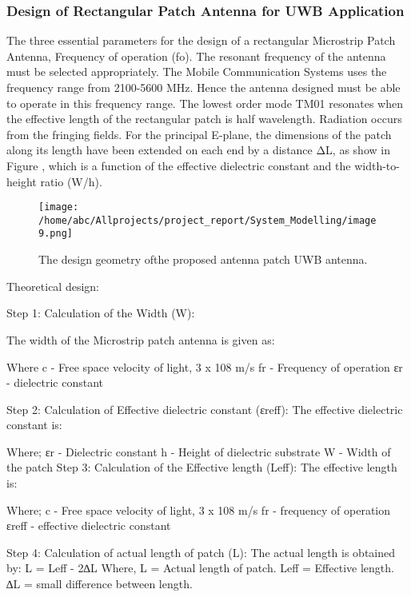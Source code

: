 \documentclass[12pt]{article}
\begin{document}
       \subsubsection{ Design of  Rectangular Patch Antenna for UWB Application}
        \justify
         The three essential parameters for the design of a rectangular Microstrip Patch Antenna, Frequency of operation (fo). The resonant frequency of the antenna must be selected appropriately. The Mobile Communication Systems uses the frequency range from 2100-5600 MHz. Hence the antenna designed must be able to operate in this frequency range. The lowest order mode TM01 resonates when the effective length of the rectangular patch is half wavelength. Radiation occurs from the fringing fields. For the principal E-plane, the dimensions of the patch along its length have been extended on each end by a distance ΔL, as show in Figure , which is a function of the effective dielectric constant and the width-to-height ratio (W/h).
          \begin{figure}
          	\centering
          	\texttt{[image: /home/abc/Allprojects/project\_report/System\_Modelling/image9.png]}
          	\caption{The design geometry ofthe proposed antenna patch UWB antenna.}
          \end{figure}

         Theoretical design:

         Step 1: Calculation of the Width (W):

         The width of the Microstrip patch antenna is given as:

         Where
             c - Free space velocity of light, 3 x 108 m/s
         fr - Frequency of operation
         εr - dielectric constant

         Step 2: Calculation of Effective dielectric constant (εreff):
         The effective dielectric constant is:

         Where;
                εr - Dielectric constant
         h - Height of dielectric substrate
         W - Width of the patch
         Step 3: Calculation of the Effective length (Leff):
         The effective length is:

         Where;
          c - Free space velocity of light, 3 x 108 m/s
         fr - frequency of operation
         εreff - effective dielectric constant

         Step 4: Calculation of actual length of patch (L):
         The actual length is obtained by:
         L = Leff - 2∆L
         Where,
         L 	= Actual length of patch.
         Leff 	 = Effective length.
         ∆L 	= small difference between length.
\end{document}
